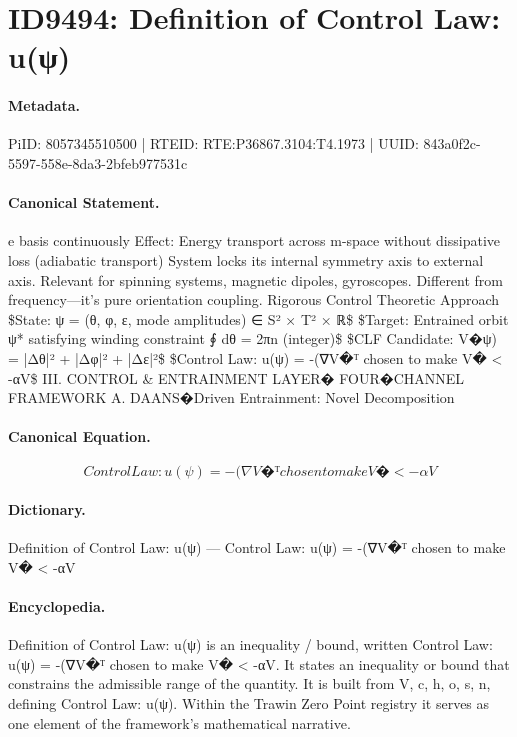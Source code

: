\section*{ID9494: Definition of Control Law: u(ψ)}
\paragraph{Metadata.}
PiID: 8057345510500 | RTEID: RTE:P36867.3104:T4.1973 | UUID: 843a0f2c-5597-558e-8da3-2bfeb977531c

\paragraph{Canonical Statement.}
e basis continuously Effect: Energy transport across m-space without dissipative loss (adiabatic transport) System locks its internal symmetry axis to external axis. Relevant for spinning systems, magnetic dipoles, gyroscopes. Different from frequency—it's pure orientation coupling. Rigorous Control Theoretic Approach \$State: ψ = (θ, φ, ε, mode amplitudes) ∈ S² × T² × ℝ\$ \$Target: Entrained orbit ψ* satisfying winding constraint ∮ dθ = 2πn (integer)\$ \$CLF Candidate: V�ψ) = |Δθ|² + |Δφ|² + |Δε|²\$ \$Control Law: u(ψ) = -(∇V�ᵀ chosen to make V� < -αV\$ III. CONTROL \& ENTRAINMENT LAYER� FOUR�CHANNEL FRAMEWORK A. DAANS�Driven Entrainment: Novel Decomposition

\paragraph{Canonical Equation.}
\[
Control Law: u(ψ) = -(∇V�ᵀ chosen to make V� < -αV
\]

\paragraph{Dictionary.}
Definition of Control Law: u(ψ) — Control Law: u(ψ) = -(∇V�ᵀ chosen to make V� < -αV

\paragraph{Encyclopedia.}
Definition of Control Law: u(ψ) is an inequality / bound, written Control Law: u(ψ) = -(∇V�ᵀ chosen to make V� < -αV. It states an inequality or bound that constrains the admissible range of the quantity. It is built from V, c, h, o, s, n, defining Control Law: u(ψ). Within the Trawin Zero Point registry it serves as one element of the framework's mathematical narrative.
